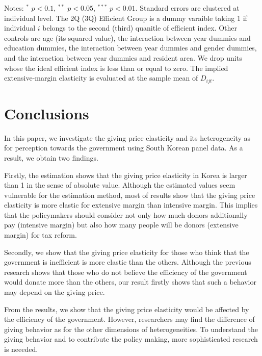 \documentclass[
  11pt,
  a4paper,
]{article}
\begin{document}
\begin{table}
\begin{threeparttable}
  \begin{tablenotes}
  \item Notes: $^{*}$ $p < 0.1$, $^{**}$ $p < 0.05$, $^{***}$ $p < 0.01$. Standard errors are clustered at individual level. The 2Q (3Q) Efficient Group is a dummy varaible taking 1 if individual $i$ belongs to the second (third) quanitle of efficient index. Other controls are age (its squared value), the interaction between year dummies and education dummies, the interaction between year dummies and gender dummies, and the interaction between year dummies and resident area. We drop units whose the ideal efficient index is less than or equal to zero. The implied extensive-margin elasticity is evaluated at the sample mean of $D_{ijt}$.
  \end{tablenotes}
  \end{threeparttable}
  \end{table}

  \hypertarget{conclusions}{%
  \section{Conclusions}\label{conclusions}}

  In this paper, we investigate the giving price elasticity and its heterogeneity as for perception towards the government using South Korean panel data. As a result, we obtain two findings.

  Firstly, the estimation shows that the giving price elasticity in Korea is larger than 1 in the sense of absolute value. Although the estimated values seem vulnerable for the estimation method, most of results show that the giving price elasticity is more elastic for extensive margin than intensive margin. This implies that the policymakers should consider not only how much donors additionally pay (intensive margin) but also how many people will be donors (extensive margin) for tax reform.

  Secondly, we show that the giving price elasticity for those who think that the government is inefficient is more elastic than the others. Although the previous research shows that those who do not believe the efficiency of the government would donate more than the others, our result firstly shows that such a behavior may depend on the giving price.

  From the results, we show that the giving price elasticity would be affected by the efficiency of the government. However, researchers may find the difference of giving behavior as for the other dimensions of heterogeneities. To understand the giving behavior and to contribute the policy making, more sophisticated research is neeeded.
\end{document}

